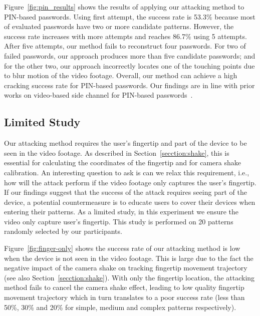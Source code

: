         Figure~\ref{fig:pin_results} shows the
        results of applying our attacking method to PIN-based passwords.
        Using first attempt, the success rate is  53.3\% because most of
        evaluated passwords have two or more candidate patterns. However, the
        success rate increases with more attempts and reaches 86.7\% using 5
        attempts. After five attempts, our method fails to reconstruct four
        passwords. For two of failed passwords, our approach produces more
        than five candidate passwords; and for the other two, our approach
        incorrectly locates one of the touching points due to  blur
        motion of the video footage. Overall, our method can achieve a high
        cracking success rate for PIN-based passwords. Our findings are in
        line with prior works on video-based side channel for PIN-based
        passwords~\cite{shukla2014beware}.

%


\subsection{Limited Study}
\label{section: limited-study}

Our attacking method requires the user's fingertip and part of the device to be seen in the video footage.  As
described in Section~\ref{secction:shake}, this is essential for calculating the coordinates of the fingertip and for
camera shake calibration. An interesting question to ask is can we relax this requirement, i.e., how will the attack
perform if the video footage only captures the user's fingertip. If our findings
suggest that the success of the attack requires seeing part of the device, a potential countermeasure is to educate users to cover their devices when entering their patterns.
As a limited study, in this experiment we ensure the video only capture user's fingertip. This study is performed on 20 patterns randomly selected by our participants.

Figure~\ref{fig:finger-only} shows the success rate of our attacking method is low when the device is not seen in the video footage.
This is large due to the fact the negative impact of the camera shake on tracking fingertip movement trajectory (see also Section~\ref{secction:shake}).
With only the fingertip location, the attacking method fails to cancel the camera shake effect, leading to low quality fingertip movement trajectory
which in turn translates to a poor success rate (less than 50\%, 30\% and 20\% for simple, medium and complex patterns respectively).

